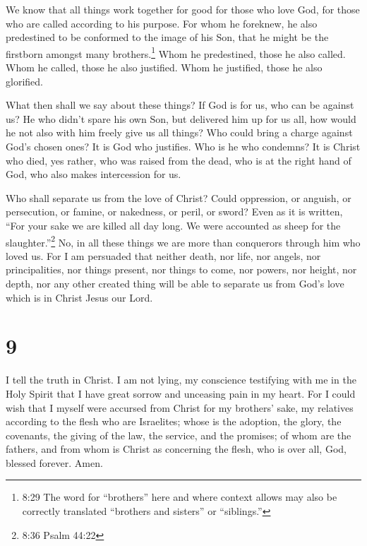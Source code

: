  We know that all things work together for good for those
who love God, for those who are called according to his purpose.
 For whom he foreknew, he also predestined to be conformed
to the image of his Son, that he might be the firstborn amongst many
brothers.\footnote{8:29 The word for ``brothers'' here and where context
  allows may also be correctly translated ``brothers and sisters'' or
  ``siblings.''}  Whom he predestined, those he also
called. Whom he called, those he also justified. Whom he justified,
those he also glorified.

 What then shall we say about these things? If God is for
us, who can be against us?  He who didn't spare his own
Son, but delivered him up for us all, how would he not also with him
freely give us all things?  Who could bring a charge
against God's chosen ones? It is God who justifies.  Who is
he who condemns? It is Christ who died, yes rather, who was raised from
the dead, who is at the right hand of God, who also makes intercession
for us.

 Who shall separate us from the love of Christ? Could
oppression, or anguish, or persecution, or famine, or nakedness, or
peril, or sword?  Even as it is written, ``For your sake we
are killed all day long. We were accounted as sheep for the
slaughter.''\footnote{8:36 Psalm 44:22}  No, in all these
things we are more than conquerors through him who loved us.
 For I am persuaded that neither death, nor life, nor
angels, nor principalities, nor things present, nor things to come, nor
powers,  nor height, nor depth, nor any other created thing
will be able to separate us from God's love which is in Christ Jesus our
Lord.

\hypertarget{section-8}{%
\section{9}\label{section-8}}

 I tell the truth in Christ. I am not lying, my conscience
testifying with me in the Holy Spirit  that I have great
sorrow and unceasing pain in my heart.  For I could wish
that I myself were accursed from Christ for my brothers' sake, my
relatives according to the flesh  who are Israelites; whose
is the adoption, the glory, the covenants, the giving of the law, the
service, and the promises;  of whom are the fathers, and
from whom is Christ as concerning the flesh, who is over all, God,
blessed forever. Amen.

